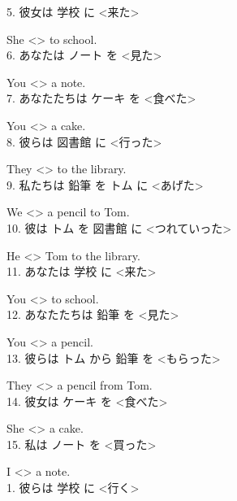\documentclass[uplatex,
paper=a4,
fontsize=18pt,
jafontsize=16pt,
number_of_lines=30,
line_length=30zh,
baselineskip=25pt,
]{jlreq}
\begin{document}
5.  彼女は 学校 に <来た>

  She <\hspace{3em}> to school.
\\

6.  あなたは ノート を <見た>

  You <\hspace{3em}> a note.
\\

7.  あなたたちは ケーキ を <食べた>

  You <\hspace{3em}> a cake.
\\

8.  彼らは 図書館 に <行った>

  They <\hspace{3em}> to the library.
\\

9.  私たちは 鉛筆 を トム に <あげた>

  We <\hspace{3em}> a pencil to Tom.
\\

10.  彼は トム を 図書館 に <つれていった>

  He <\hspace{3em}> Tom to the library.
\\

11.  あなたは 学校 に <来た>

  You <\hspace{3em}> to school.
\\

12.  あなたたちは 鉛筆 を <見た>

  You <\hspace{3em}> a pencil.
\\

13.  彼らは トム から 鉛筆 を <もらった>

  They <\hspace{3em}> a pencil from Tom.
\\

14.  彼女は ケーキ を <食べた>

  She <\hspace{3em}> a cake.
\\

15.  私は ノート を <買った>

  I <\hspace{3em}> a note.
\\


\newpage
{}
1.  彼らは 学校 に <行く>
\end{document}
